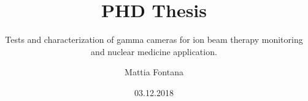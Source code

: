 \title{PHD Thesis}
\subtitle{Tests and characterization of gamma
cameras for ion beam therapy monitoring and nuclear
medicine application.}
\author{Mattia Fontana}
\date{03.12.2018}
\maketitle